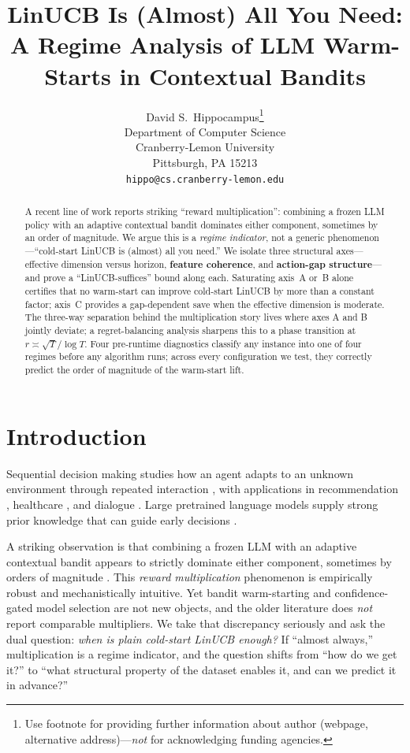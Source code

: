 \documentclass{article}
\title{LinUCB Is (Almost) All You Need:\\ A Regime Analysis of LLM Warm-Starts in Contextual Bandits}
\author{%
  David S.~Hippocampus\thanks{Use footnote for providing further information
    about author (webpage, alternative address)---\emph{not} for acknowledging
    funding agencies.} \\
  Department of Computer Science\\
  Cranberry-Lemon University\\
  Pittsburgh, PA 15213 \\
  \texttt{hippo@cs.cranberry-lemon.edu} \\
}
\theoremstyle{definition}
\theoremstyle{remark}
\theoremstyle{remark}
\begin{document}
\maketitle
\begin{abstract}
A recent line of work reports striking ``reward multiplication'': combining a
frozen LLM policy with an adaptive contextual bandit dominates either component,
sometimes by an order of magnitude. We argue this is a \emph{regime indicator},
not a generic phenomenon---``cold-start LinUCB is (almost) all you need.''
We isolate three structural axes---effective dimension versus horizon,
\textbf{feature coherence}, and \textbf{action-gap structure}---and prove a
``LinUCB-suffices'' bound along each. Saturating axis~A or~B alone certifies
that no warm-start can improve cold-start LinUCB by more than a constant
factor; axis~C provides a gap-dependent save when the effective dimension is
moderate. The three-way separation behind the multiplication story lives where
axes A and B jointly deviate; a regret-balancing analysis sharpens this to a
phase transition at $r\asymp\sqrt T/\log T$. Four pre-runtime diagnostics
classify any instance into one of four regimes before any algorithm runs;
across every configuration we test, they correctly predict the order of
magnitude of the warm-start lift.
\end{abstract}


\section{Introduction}
\label{sec:intro}

Sequential decision making studies how an agent adapts to an unknown
environment through repeated interaction \cite{zhu2022largeaction,zhu2022contextual},
with applications in recommendation \cite{li2010contextual,agarwal2016making},
healthcare \cite{tewari2017ads,svensson2023sequential}, and dialogue
\cite{li2016deep}. Large pretrained language models supply strong prior
knowledge that can guide early decisions
\cite{brown2020language,ouyang2022training,achiam2023gpt,
alamdari2024jumpstarting,abbasiyadkori2024believe}.

A striking observation is that combining a frozen LLM with an adaptive
contextual bandit appears to strictly dominate either component, sometimes by
orders of magnitude \cite{chen2024llmdecision,huangcontextual}. This
\emph{reward multiplication} phenomenon is empirically robust and mechanistically
intuitive. Yet bandit warm-starting \cite{bastani2021mostly,zhang2019warm} and
confidence-gated model selection
\cite{auer2002nonstochastic,agarwal2017corralling,pacchiano2020model} are not
new objects, and the older literature does \emph{not} report comparable
multipliers. We take that discrepancy seriously and ask the dual question:
\emph{when is plain cold-start LinUCB enough?} If ``almost always,''
multiplication is a regime indicator, and the question shifts from ``how do
we get it?'' to ``what structural property of the dataset enables it, and can
we predict it in advance?''
\end{document}
